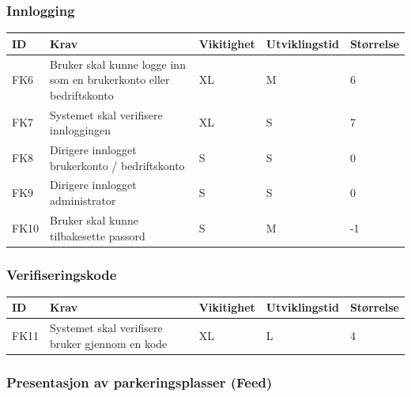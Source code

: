 \documentclass[12pt]{article}
\newcommand{\cello}{\cellcolor{orange!25}}
\newcommand{\celly}{\cellcolor{yellow!25}}
\newcommand{\cellg}{\cellcolor{green!25}}
\begin{document}
        \subsubsection{Innlogging}
        
        \begin{tabular}{|p{2cm}|p{6cm}|
            >{\centering\arraybackslash}p{2cm}|
            >{\centering\arraybackslash}p{2cm}|
            >{\centering\arraybackslash}p{2cm}|} 
            \hline
            \bf ID & \bf Krav & \bf Vikitighet & \bf Utviklingstid & \bf Størrelse\\
            \hline
            FK6
            &
            Bruker skal kunne logge inn som en brukerkonto eller bedriftskonto
            & XL & M & \cellg 6\\
            \hline
            FK7
            &
            Systemet skal verifisere innloggingen
            & XL & S & \cellg 7\\
            \hline
            FK8
            &
            Dirigere innlogget brukerkonto / bedriftskonto
            & S & S & \celly 0\\
            \hline
            FK9
            &
            Dirigere innlogget administrator
            & S & S & \celly 0\\
            \hline
            FK10
            &
            Bruker skal kunne tilbakesette passord
            & S & M & \cello -1\\
            \hline
        \end{tabular}
        
        \subsubsection{Verifiseringskode}
        
        \begin{tabular}{|p{2cm}|p{6cm}|
            >{\centering\arraybackslash}p{2cm}|
            >{\centering\arraybackslash}p{2cm}|
            >{\centering\arraybackslash}p{2cm}|} 
            \hline
            \bf ID & \bf Krav & \bf Vikitighet & \bf Utviklingstid & \bf Størrelse\\
            \hline
            FK11
            &
            Systemet skal verifisere bruker gjennom en kode
            & XL & L & \cellg 4\\
            \hline
        \end{tabular}
        
        \subsubsection{Presentasjon av parkeringsplasser (Feed)}
        
\end{document}

